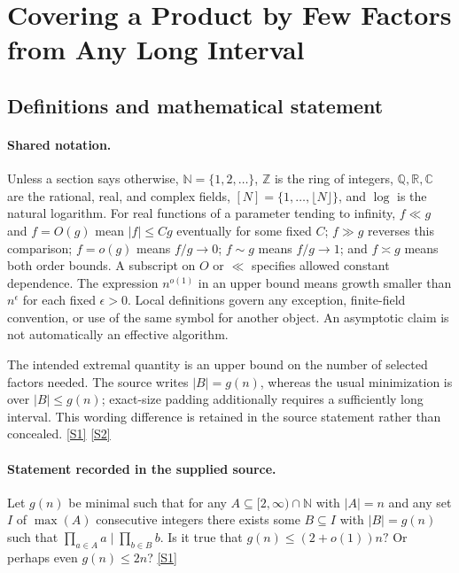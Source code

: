 \documentclass[11pt,a4paper]{article}
\newcommand{\N}{\mathbb{N}}
\newcommand{\Z}{\mathbb{Z}}
\newcommand{\Q}{\mathbb{Q}}
\newcommand{\R}{\mathbb{R}}
\newcommand{\C}{\mathbb{C}}
\newcommand{\sref}[2]{\hyperlink{source:#1:#2}{[S#2]}}
\begin{document}
\section{Covering a Product by Few Factors from Any Long Interval}\label{statement}


\subsection{Definitions and mathematical statement}

\paragraph{Shared notation.}Unless a section says otherwise, $\N=\{1,2,\ldots\}$,
$\Z$ is the ring of integers, $\Q,\R,\C$ are the rational, real, and complex
fields, $[N]=\{1,\ldots,\lfloor N\rfloor\}$, and $\log$ is the natural
logarithm. For real functions of a parameter tending to infinity,
$f\ll g$ and $f=O(g)$ mean $|f|\leq Cg$ eventually for some fixed $C$;
$f\gg g$ reverses this comparison; $f=o(g)$ means $f/g\to0$;
$f\sim g$ means $f/g\to1$; and $f\asymp g$ means both order bounds.
A subscript on $O$ or $\ll$ specifies allowed constant dependence.
The expression $n^{o(1)}$ in an upper bound means growth smaller than
$n^\epsilon$ for each fixed $\epsilon>0$. Local definitions govern any
exception, finite-field convention, or use of the same symbol for another
object. An asymptotic claim is not automatically an effective algorithm.



The intended extremal quantity is an upper bound on the number of selected factors needed. The source writes $|B|=g(n)$, whereas the usual minimization is over $|B|\leq g(n)$; exact-size padding additionally requires a sufficiently long interval. This wording difference is retained in the source statement rather than concealed. \sref{statement}{1} \sref{statement}{2}

\paragraph{Statement recorded in the supplied source.}
Let $g(n)$ be minimal such that for any $A\subseteq [2,\infty)\cap \mathbb{N}$ with $\lvert A\rvert =n$ and any set $I$ of $\max(A)$ consecutive integers there exists some $B\subseteq I$ with $\lvert B\rvert=g(n)$ such that $ \prod_{a\in A} a \mid \prod_{b\in B}b. $ Is it true that $ g(n) \leq (2+o(1))n? $ Or perhaps even $g(n)\leq 2n$? \sref{statement}{1}
\end{document}
